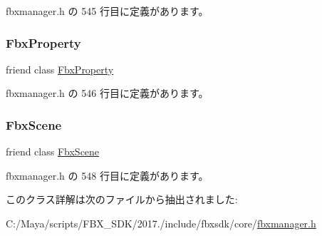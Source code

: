  fbxmanager.\+h の 545 行目に定義があります。

\mbox{\label{class_fbx_manager_a5d7018830479ec28905f28575480f88f}} 
\subsubsection{\texorpdfstring{Fbx\+Property}{FbxProperty}}
{\footnotesize\ttfamily friend class \hyperlink{class_fbx_property}{Fbx\+Property}\hspace{0.3cm}{\ttfamily [friend]}}



 fbxmanager.\+h の 546 行目に定義があります。

\mbox{\label{class_fbx_manager_abcc807c3523609e1c734764de626facc}} 
\subsubsection{\texorpdfstring{Fbx\+Scene}{FbxScene}}
{\footnotesize\ttfamily friend class \hyperlink{class_fbx_scene}{Fbx\+Scene}\hspace{0.3cm}{\ttfamily [friend]}}



 fbxmanager.\+h の 548 行目に定義があります。



このクラス詳解は次のファイルから抽出されました\+:\begin{DoxyCompactItemize}
\item 
C\+:/\+Maya/scripts/\+F\+B\+X\+\_\+\+S\+D\+K/2017./include/fbxsdk/core/\hyperlink{fbxmanager_8h}{fbxmanager.\+h}\end{DoxyCompactItemize}
